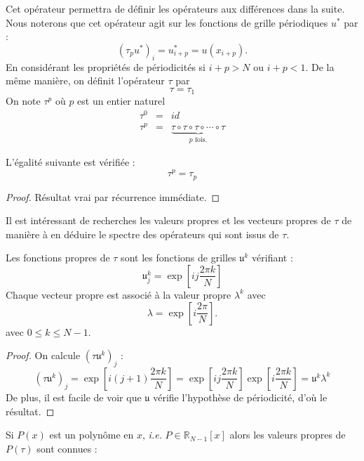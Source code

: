 Cet opérateur permettra de définir les opérateurs aux différences dans la suite. Nous noterons que cet opérateur agit sur les fonctions de grille périodiques $u^*$ par :
\begin{equation}
(\tau_p u^*)_i = u^*_{i+p} = u(x_{i+p}).
\end{equation}
En considérant les propriétés de périodicités si $i+p > N$ ou $i+p<1$.
De la même manière, on définit l'opérateur $\tau$ par 
\begin{equation}
\tau = \tau_{1}
\end{equation}
On note $\tau^p$ où $p$ est un entier naturel 
\begin{equation}
\begin{array}{rcl}
\tau^0 & = & id\\
\tau^p & = & \underbrace{\tau \circ \tau \circ \tau \circ \cdots \circ \tau}_{p \text{ fois.}}
\end{array}
\end{equation}

\begin{proposition}
L'égalité suivante est vérifiée :
\begin{equation}
\tau^p = \tau_p
\end{equation}
\end{proposition}

\begin{proof}
Résultat vrai par récurrence immédiate.
\end{proof}
Il est intéressant de recherches les valeurs propres et les vecteurs propres de $\tau$ de manière à en déduire le spectre des opérateurs qui sont issus de $\tau$.


\begin{proposition}
Les fonctions propres de $\tau$ sont les fonctions de grilles $\mathfrak{u}^k$ vérifiant :
\begin{equation}
\mathfrak{u}_j^k = \exp \left[ i j \dfrac{2 \pi k}{N} \right]
\label{eq:vecteurpropre_tau}
\end{equation}
Chaque vecteur propre est associé à la valeur propre $\lambda^k$ avec 
\begin{equation}
\lambda = \exp \left[ i \dfrac{2 \pi}{N} \right].
\end{equation}
avec $0 \leq k \leq N-1$.
\end{proposition}


\begin{proof}
On calcule $(\tau \mathfrak{u}^k)_j$ :
\begin{equation}
(\tau \mathfrak{u}^k)_j = \exp \left[ i (j+1) \dfrac{2 \pi k}{N} \right] = \exp \left[ i j \dfrac{2 \pi k}{N} \right] \exp \left[ i \dfrac{2 \pi k}{N} \right]  = \mathfrak{u}^k \lambda^k
\end{equation}
De plus, il est facile de voir que $\mathfrak{u}$ vérifie l'hypothèse de périodicité, d'où le résultat.
\end{proof}
Si $P(x)$ est un polynôme en $x$, \textit{i.e.} $P \in \mathbb{R}_{N-1} [x]$ alors les valeurs propres de $P(\tau)$ sont connues :

